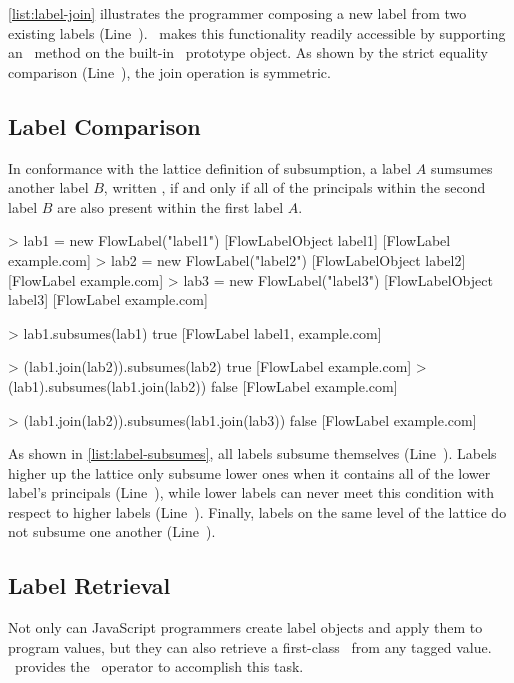 \autoref{list:label-join} illustrates the programmer composing a new label from two existing labels (Line~).
\FlowCore\ makes this functionality readily accessible by supporting an \mjoin\ method on the built-in \FlowLabel\ prototype object.
As shown by the strict equality comparison (Line~), the join operation is symmetric.

\subsection{Label Comparison}

In conformance with the lattice definition of subsumption, a label $A$ sumsumes another label $B$, written , if and only if all of the principals within the second label $B$ are also present within the first label $A$.

\begin{jscode}
> lab1 = new FlowLabel("label1")
  [FlowLabelObject label1] [FlowLabel example.com]
> lab2 = new FlowLabel("label2")
  [FlowLabelObject label2] [FlowLabel example.com]
> lab3 = new FlowLabel("label3")
  [FlowLabelObject label3] [FlowLabel example.com]

> lab1.subsumes(lab1)
  true [FlowLabel label1, example.com]

> (lab1.join(lab2)).subsumes(lab2)
  true [FlowLabel example.com]
> (lab1).subsumes(lab1.join(lab2))
  false [FlowLabel example.com]

> (lab1.join(lab2)).subsumes(lab1.join(lab3))
  false [FlowLabel example.com]
\end{jscode}

As shown in \autoref{list:label-subsumes}, all labels subsume themselves (Line~).
Labels higher up the lattice only subsume lower ones when it contains all of the lower label's principals (Line~), while lower labels can never meet this condition with respect to higher labels (Line~).
Finally, labels on the same level of the lattice do not subsume one another (Line~).

\subsection{Label Retrieval}

Not only can JavaScript programmers create label objects and apply them to program values, but they can also retrieve a first-class \FlowLabelObject\ from any tagged value.
\FlowCore\ provides the \mlabelof\ operator to accomplish this task.

